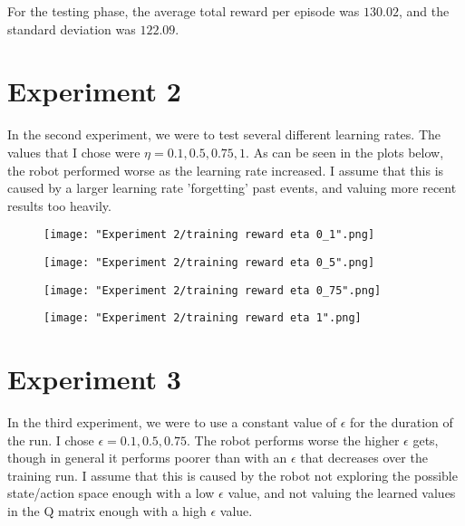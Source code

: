 \documentclass{article}
\begin{document}
\begin{flushleft}
For the testing phase, the average total reward per episode was $130.02$, and the standard deviation was $122.09$.
\end{flushleft}


\clearpage
\section{Experiment 2}

\begin{flushleft}
In the second experiment, we were to test several different learning rates.  The values that I chose were $\eta = 0.1, 0.5, 0.75, 1$.  As can be seen in the plots below, the robot performed worse as the learning rate increased.  I assume that this is caused by a larger learning rate 'forgetting' past events, and valuing more recent results too heavily.  
\end{flushleft}

\begin{figure}[h!]
    \noindent\texttt{[image: "Experiment 2/training reward eta 0\_1".png]}
\end{figure}

\begin{figure}[h!]
    \noindent\texttt{[image: "Experiment 2/training reward eta 0\_5".png]}
\end{figure}

\begin{figure}[h!]
    \noindent\texttt{[image: "Experiment 2/training reward eta 0\_75".png]}
\end{figure}

\begin{figure}[h!]
    \noindent\texttt{[image: "Experiment 2/training reward eta 1".png]}
\end{figure}


\clearpage
\section{Experiment 3}

\begin{flushleft}
In the third experiment, we were to use a constant value of $\epsilon$ for the duration of the run.  I chose $\epsilon = 0.1, 0.5, 0.75$.  The robot performs worse the higher $\epsilon$ gets, though in general it performs poorer than with an $\epsilon$ that decreases over the training run.  I assume that this is caused by the robot not exploring the possible state/action space enough with a low $\epsilon$ value, and not valuing the learned values in the Q matrix enough with a high $\epsilon$ value.
\end{flushleft}
\end{document}
